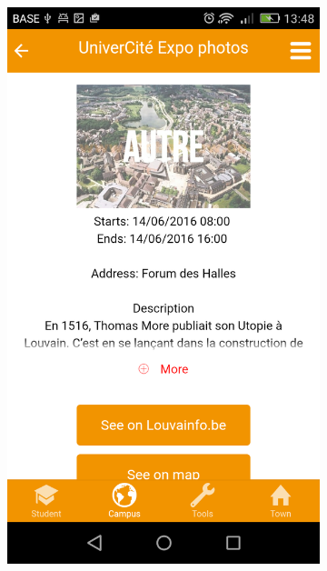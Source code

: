 \documentclass{eplmastersthesis}
\begin{document}
\begin{figure}
\begin{subfigure}[b]{0.3\textwidth}
        \includegraphics[width=\textwidth]{Images/Application_screens/Screenshot_2016-06-06-13-48-21.png}
    \end{subfigure}
\end{figure}
\end{document}
